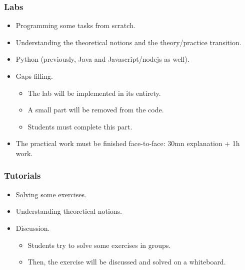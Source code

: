 \documentclass{beamer}
\begin{document}
\begin{frame}
	\frametitle{Labs}
	
	\begin{itemize}
		\item Programming some tasks from scratch.
		\item {} Understanding the theoretical notions and the theory/practice transition.
		\item {} Python (previously, Java and Javascript/nodejs as well).
		\item {} Gaps filling.
		\begin{itemize}
			\item The lab will be implemented in its entirety.
			\item A small part will be removed from the code.
			\item Students must complete this part.
		\end{itemize}
		\item The practical work must be finished face-to-face: 30mn explanation + 1h work.
	\end{itemize}
	
\end{frame}

\begin{frame}
	\frametitle{Tutorials}
	
	\begin{itemize}
		\item Solving some exercises.
		\item {} Understanding theoretical notions.
		\item {} Discussion.
		\begin{itemize}
			\item Students try to solve some exercises in groups.
			\item Then, the exercise will be discussed and solved on a whiteboard.
		\end{itemize}
	\end{itemize}
	
\end{frame}
\end{document}

